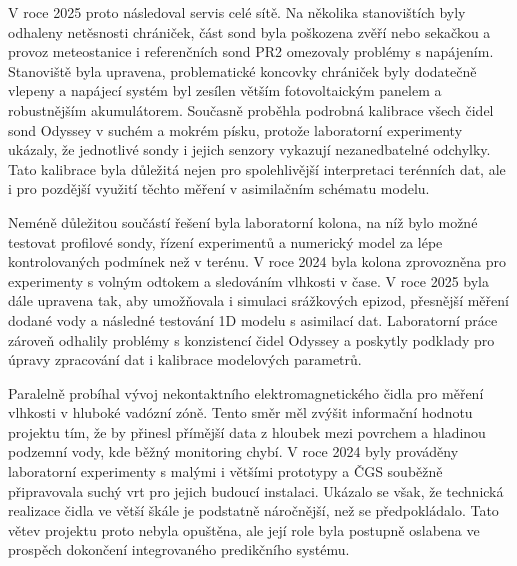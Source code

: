 \documentclass[11pt,a4paper]{article}
\begin{document}
\begin{onehalfspacing}
V roce 2025 proto následoval servis celé sítě. Na několika stanovištích byly
odhaleny netěsnosti chrániček, část sond byla poškozena zvěří nebo sekačkou a
provoz meteostanice i referenčních sond PR2 omezovaly problémy s napájením.
Stanoviště byla upravena, problematické koncovky chrániček byly dodatečně
vlepeny a napájecí systém byl zesílen větším fotovoltaickým panelem a
robustnějším akumulátorem. Současně proběhla podrobná kalibrace všech čidel
sond Odyssey v suchém a mokrém písku, protože laboratorní experimenty
ukázaly, že jednotlivé sondy i jejich senzory vykazují nezanedbatelné
odchylky. Tato kalibrace byla důležitá nejen pro spolehlivější interpretaci
terénních dat, ale i pro pozdější využití těchto měření v asimilačním
schématu modelu.


Neméně důležitou součástí řešení byla laboratorní kolona, na níž bylo možné
testovat profilové sondy, řízení experimentů a numerický model za lépe
kontrolovaných podmínek než v terénu. V roce 2024 byla kolona zprovozněna pro
experimenty s volným odtokem a sledováním vlhkosti v čase. V roce 2025 byla
dále upravena tak, aby umožňovala i simulaci srážkových epizod, přesnější
měření dodané vody a následné testování 1D modelu s asimilací dat. Laboratorní
práce zároveň odhalily problémy s konzistencí čidel Odyssey a poskytly
podklady pro úpravy zpracování dat i kalibrace modelových parametrů.

Paralelně probíhal vývoj nekontaktního elektromagnetického čidla pro měření
vlhkosti v hluboké vadózní zóně. Tento směr měl zvýšit informační hodnotu
projektu tím, že by přinesl přímější data z hloubek mezi povrchem a hladinou
podzemní vody, kde běžný monitoring chybí. V roce 2024 byly prováděny
laboratorní experimenty s malými i většími prototypy a ČGS souběžně
připravovala suchý vrt pro jejich budoucí instalaci. Ukázalo se však, že
technická realizace čidla ve větší škále je podstatně náročnější, než se
předpokládalo. Tato větev projektu proto nebyla opuštěna, ale její role byla
postupně oslabena ve prospěch dokončení integrovaného predikčního systému.


\end{onehalfspacing}
\end{document}

